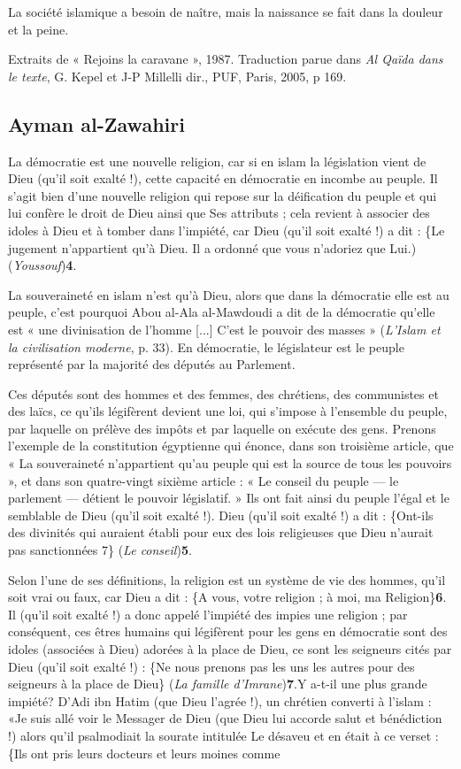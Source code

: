 La société islamique a besoin de naître, mais la naissance se fait dans
la douleur et la peine.

Extraits de « Rejoins la caravane », 1987. Traduction parue dans
\emph{Al Qaïda dans le texte}, G. Kepel et J-P Millelli dir., PUF,
Paris, 2005, p 169.
 

\hypertarget{ayman-al-zawahiri}{%
\subsection{Ayman al-Zawahiri}\label{ayman-al-zawahiri}}

 
La démocratie est une nouvelle religion, car si en islam la législation
vient de Dieu (qu'il soit exalté !), cette capacité en démocratie en
incombe au peuple. Il s'agit bien d'une nouvelle
religion qui repose sur la déification du peuple et qui lui confère le
droit de Dieu ainsi que Ses attributs ; cela revient à associer des
idoles à Dieu et à tomber dans l'impiété, car Dieu (qu'il soit exalté !)
a dit : \{Le jugement n'appartient qu'à Dieu. Il a ordonné que vous
n'adoriez que Lui.) (\emph{Youssouf})\textbf{4}.

La souveraineté en islam n'est qu'à Dieu, alors que dans la démocratie
elle est au peuple, c'est pourquoi Abou al-Ala al-Mawdoudi a dit de la
démocratie qu'elle est « une divinisation de l'homme {[}...{]} C'est le
pouvoir des masses » (\emph{L'Islam et la civilisation moderne}, p. 33).
En démocratie, le législateur est le peuple représenté par la majorité
des députés au Parlement.

Ces députés sont des hommes et des femmes, des chrétiens, des
communistes et des laïcs, ce qu'ils légifèrent devient une loi, qui
s'impose à l'ensemble du peuple, par laquelle on prélève des impôts et
par laquelle on exécute des gens. Prenons l'exemple de la constitution
égyptienne qui énonce, dans son troisième article, que « La souveraineté
n'appartient qu'au peuple qui est la source de tous les pouvoirs », et
dans son quatre-vingt sixième article : « Le conseil du peuple
--- le parlement --- détient le pouvoir législatif. » Ils ont fait ainsi
du peuple l'égal et le semblable de Dieu (qu'il soit exalté !). Dieu
(qu'il soit exalté !) a dit : \{Ont-ils des divinités qui auraient
établi pour eux des lois religieuses que Dieu n'aurait pas sanctionnées
7\} (\emph{Le conseil})\textbf{5}.

Selon l'une de ses définitions, la religion est un système de vie des
hommes, qu'il soit vrai ou faux, car Dieu a dit : \{A vous, votre
religion ; à moi, ma Religion\}\textbf{6}. Il (qu'il soit exalté !) a
donc appelé l'impiété des impies une religion ; par conséquent, ces
êtres humains qui légifèrent pour les gens en démocratie sont des idoles
(associées à Dieu) adorées à la place de Dieu, ce sont les seigneurs
cités par Dieu (qu'il soit exalté !) : \{Ne nous prenons pas les uns les
autres pour des seigneurs à la place de Dieu\} (\emph{La famille
d'Imrane})\textbf{7}.Y a-t-il une plus grande impiété? D'Adi ibn Hatim
(que Dieu l'agrée !), un chrétien converti à l'islam : «Je suis allé
voir le Messager de Dieu (que Dieu lui accorde salut et bénédiction !)
alors qu'il psalmodiait la sourate intitulée Le désaveu et en était à ce
verset : \{Ils ont pris leurs docteurs et leurs moines comme

